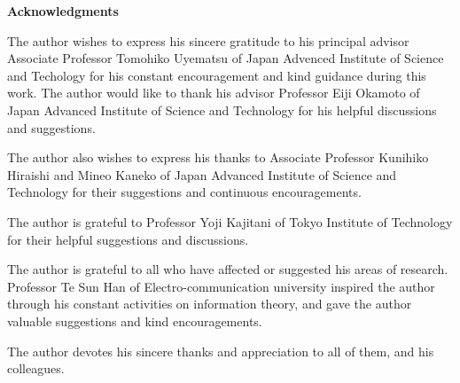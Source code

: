 \strut
\vspace{20pt}

\begin{center}
{\LARGE\bf Acknowledgments}
\end{center}
\vspace{20pt}

The author wishes to express his sincere gratitude to his principal
advisor Associate Professor Tomohiko Uyematsu of Japan Advenced
Institute of Science and Techology for his constant encouragement and kind
guidance during this work. The author would like to thank his advisor
Professor Eiji Okamoto of Japan Advanced Institute of Science and
Technology for his helpful discussions and suggestions.

The author also wishes to express his thanks to Associate Professor
Kunihiko Hiraishi and Mineo Kaneko of Japan Advanced Institute of
Science and Technology for their suggestions and continuous
encouragements.

The author is grateful to Professor Yoji Kajitani of Tokyo Institute
of Technology for their helpful suggestions and discussions.

The author is grateful to all who have affected or suggested his areas
of research. Professor Te Sun Han of Electro-communication university
inspired the author through his constant activities on information
theory, and gave the author valuable suggestions and kind encouragements.

The author devotes his sincere thanks and appreciation to all of them,
and his colleagues.